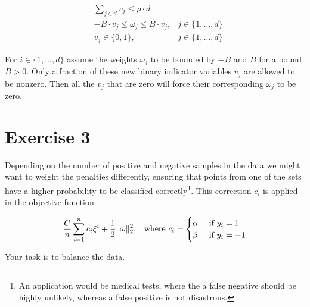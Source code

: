 \documentclass[11pt]{article}
\begin{document}
\begin{equation*}
\begin{array}{rll}
  & \sum_{j \in d} v_{j} \leq \rho \cdot d
  &
\\
  & -B \cdot v_{j} \leq \omega_{j} \leq B \cdot v_{j},
  & j \in \{ 1, \dots, d \}
\\
  & v_{j} \in \{0,1\},
  & j \in \{1,\dots, d\}
\end{array}
\end{equation*}

For $i \in \{ 1, \dots, d \}$ assume the weights $\omega_j$ to be bounded by $-B$ and $B$ for a bound $B > 0$.
Only a fraction of these new binary indicator variables $v_j$ are allowed to be nonzero.
Then all the $v_j$ that are zero will force their corresponding $\omega_j$ to be zero.

\section*{Exercise 3}

Depending on the number of positive and negative samples in the data we might want to weight the penalties differently, ensuring that points from one of the sets have a higher probability to be classified correctly\footnote{
  An application would be medical tests, where the a false negative should be highly unlikely, whereas a false positive is not disastrous.}.
This correction $c_i$ is applied in the objective function:

$$
\frac{C}{n} \sum\limits_{i = 1}^n c_i \xi^i + \frac{1}{2} \lVert \omega \rVert_2^2
\text{,\quad where } c_i =
\begin{cases}
  \alpha & \text{ if } y_i = 1 \\
  \beta & \text{ if } y_i = -1
\end{cases}
$$

Your task is to balance the data.
\end{document}
